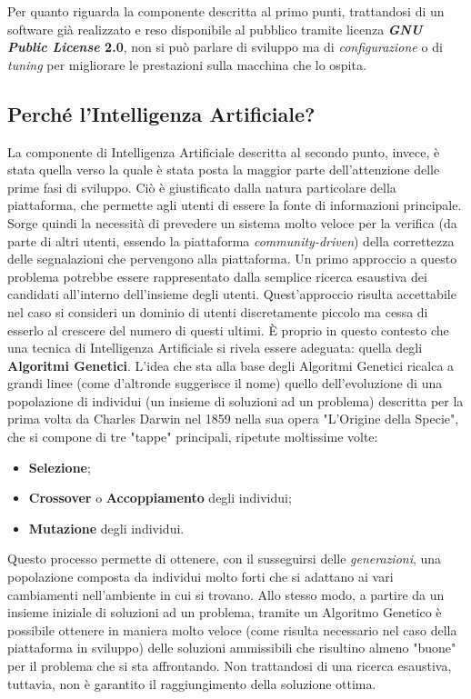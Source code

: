         Per quanto riguarda la componente descritta al primo punti, trattandosi di un software già realizzato e reso disponibile al pubblico tramite licenza \textbf{\textit{GNU Public License} 2.0}, non si può parlare di sviluppo ma di \textit{configurazione} o di \textit{tuning} per migliorare le prestazioni sulla macchina che lo ospita.

        \subsection{Perché l'Intelligenza Artificiale?}
            La componente di Intelligenza Artificiale descritta al secondo punto, invece, è stata quella verso la quale è stata posta la maggior parte dell'attenzione delle prime fasi di sviluppo. Ciò è giustificato dalla natura particolare della piattaforma, che permette agli utenti di essere la fonte di informazioni principale. Sorge quindi la necessità di prevedere un sistema molto veloce per la verifica (da parte di altri utenti, essendo la piattaforma \textit{community-driven}) della correttezza delle segnalazioni che pervengono alla piattaforma.  Un primo approccio a questo problema potrebbe essere rappresentato dalla semplice ricerca esaustiva dei candidati all'interno dell'insieme degli utenti. Quest'approccio risulta accettabile nel caso si consideri un dominio di utenti discretamente piccolo ma cessa di esserlo al crescere del numero di questi ultimi. È proprio in questo contesto che una tecnica di Intelligenza Artificiale si rivela essere adeguata: quella degli \textbf{Algoritmi Genetici}. L'idea che sta alla base degli Algoritmi Genetici ricalca a grandi linee (come d'altronde suggerisce il nome) quello dell'evoluzione di una popolazione di individui (un insieme di soluzioni ad un problema) descritta per la prima volta da Charles Darwin nel 1859 nella sua opera "L'Origine della Specie", che si compone di tre "tappe" principali, ripetute moltissime volte:

            \begin{itemize}
                \item \textbf{Selezione};
                \item \textbf{Crossover} o \textbf{Accoppiamento} degli individui;
                \item \textbf{Mutazione} degli individui.
            \end{itemize}

            Questo processo permette di ottenere, con il susseguirsi delle \textit{generazioni}, una popolazione composta da individui molto forti che si adattano ai vari cambiamenti nell'ambiente in cui si trovano.
            Allo stesso modo, a partire da un insieme iniziale di soluzioni ad un problema, tramite un Algoritmo Genetico è possibile ottenere in maniera molto veloce (come risulta necessario nel caso della piattaforma in sviluppo) delle soluzioni ammissibili che risultino almeno "buone" per il problema che si sta affrontando. Non trattandosi di una ricerca esaustiva, tuttavia, non è garantito il raggiungimento della soluzione ottima.

